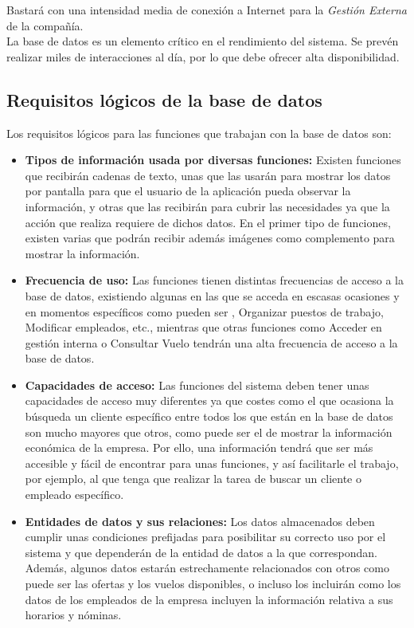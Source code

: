 \documentclass[11pt, a4paper, twoside, titlepage]{article}
\begin{document}
			Bastará con una intensidad media de conexión a Internet para la \textit{Gestión Externa} de la compañía.\\

			La base de datos es un elemento crítico en el rendimiento del sistema. Se prevén realizar miles de interacciones al día, por lo que debe ofrecer alta disponibilidad.

		\subsection{Requisitos lógicos de la base de datos}
			Los requisitos lógicos para las funciones que trabajan con la base de datos son:
			\begin{itemize}
				\item \textbf{Tipos de información usada por diversas funciones: } Existen funciones que recibirán cadenas de texto, unas que las usarán para mostrar los datos por pantalla para que el usuario de la aplicación pueda observar la información, y otras que las recibirán para cubrir las necesidades ya que la acción que realiza requiere de dichos datos. En el primer tipo de funciones, existen varias que podrán recibir además imágenes como complemento para mostrar la información.
				\item \textbf{Frecuencia de uso: } Las funciones tienen distintas frecuencias de acceso a la base de datos, existiendo algunas en las que se acceda en escasas ocasiones y en momentos específicos como pueden ser , Organizar puestos de trabajo, Modificar empleados, etc., mientras que otras funciones como Acceder en gestión interna o Consultar Vuelo tendrán una alta frecuencia de acceso a la base de datos.
				\item \textbf{Capacidades de acceso: } Las funciones del sistema deben tener unas capacidades de acceso muy diferentes ya que costes como el que ocasiona la búsqueda un cliente específico entre todos los que están en la base de datos son mucho mayores que otros, como puede ser el de mostrar la información económica de la empresa. Por ello, una información tendrá que ser más accesible y fácil de encontrar para unas funciones, y así facilitarle el trabajo, por ejemplo, al que tenga que realizar la tarea de buscar un cliente o empleado específico. 
				\item \textbf{Entidades de datos y sus relaciones: } Los datos almacenados deben cumplir unas condiciones prefijadas para posibilitar su correcto uso por el sistema y que dependerán de la entidad de datos a la que correspondan. Además, algunos datos estarán estrechamente relacionados con otros como puede ser las ofertas y los vuelos disponibles, o incluso los incluirán como los datos de los empleados de la empresa incluyen la información relativa a sus horarios y nóminas.
			\end{itemize}
\end{document}
